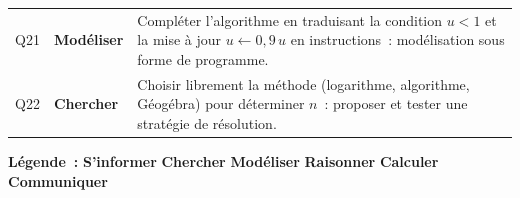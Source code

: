 \documentclass[a4paper,10pt]{article}
\newcommand{\sinformer}{\colorbox{sinformer}{\textcolor{sinformertxt}{\footnotesize\textbf{S'informer}}}}
\newcommand{\chercher}{\colorbox{chercher}{\textcolor{cherchertxt}{\footnotesize\textbf{Chercher}}}}
\newcommand{\modeliser}{\colorbox{modeliser}{\textcolor{modelisertxt}{\footnotesize\textbf{Mod\'eliser}}}}
\newcommand{\raisonner}{\colorbox{raisonner}{\textcolor{raisonnertxt}{\footnotesize\textbf{Raisonner}}}}
\newcommand{\calculer}{\colorbox{calculer}{\textcolor{calculertxt}{\footnotesize\textbf{Calculer}}}}
\newcommand{\communiquer}{\colorbox{communiquer}{\textcolor{communiquertxt}{\footnotesize\textbf{Communiquer}}}}
\newlength{\colQ}    \setlength{\colQ}{0.8cm}
\newlength{\colComp} \setlength{\colComp}{4.4cm}
\newlength{\colJust} \setlength{\colJust}{11.4cm}
\begin{document}
\begin{longtable}{%
  >{\centering\arraybackslash}p{\colQ}
  >{\centering\arraybackslash}p{\colComp}
  >{\small\raggedright\arraybackslash}p{\colJust}
}
Q21 & \modeliser
    & Compl\'eter l'algorithme en traduisant la condition $u < 1$
      et la mise \`a jour $u \leftarrow 0{,}9\,u$ en
      instructions~: mod\'elisation sous forme de programme. \\[4pt]

Q22 & \chercher
    & Choisir librement la m\'ethode (logarithme, algorithme,
      G\'eog\'ebra) pour d\'eterminer $n$~: proposer et tester une
      strat\'egie de r\'esolution. \\

\bottomrule
\end{longtable}

\vspace{6pt}

\noindent\textbf{L\'egende~:}\quad
\sinformer\quad
\chercher\quad
\modeliser\quad
\raisonner\quad
\calculer\quad
\communiquer

\vspace{4pt}
\end{document}
